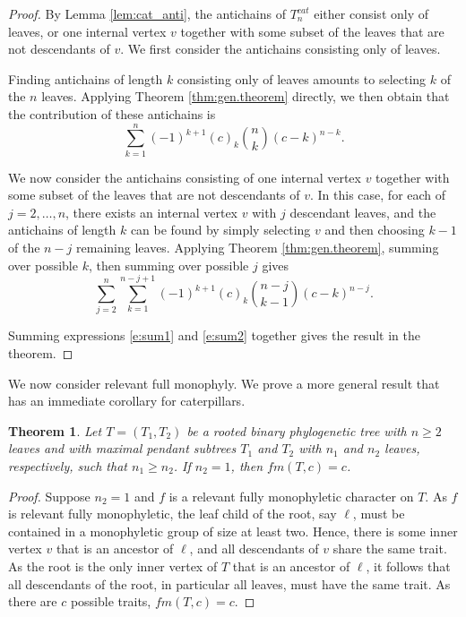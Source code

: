 \documentclass{amsart}
\newtheorem{theorem}{Theorem}
\theoremstyle{definition}
\begin{document}
\begin{proof}
By Lemma \ref{lem:cat_anti}, the antichains of $T_n^{cat}$ either consist only of leaves, or one internal vertex $v$ together with some subset of the leaves that are not descendants of $v$. We first consider the antichains consisting only of leaves. 

Finding antichains of length $k$ consisting only of leaves amounts to selecting $k$ of the $n$ leaves. Applying Theorem \ref{thm:gen.theorem} directly, we then obtain that the contribution of these antichains is 
\begin{equation}\label{e:sum1} 
\sum_{k=1}^{n}
(-1)^{k+1}
(c)_k
\binom{n}{k}
(c-k)^{n-k}.
\end{equation}

We now consider the antichains consisting of one internal vertex $v$ together with some subset of the leaves that are not descendants of $v$. In this case, for each of $j=2,\dots,n$, there exists an internal vertex $v$ with $j$ descendant leaves, and the antichains of length $k$ can be found by simply selecting $v$ and then choosing $k-1$ of the $n-j$ remaining leaves. Applying Theorem \ref{thm:gen.theorem}, summing over possible $k$, then summing over possible $j$ gives
\begin{equation}\label{e:sum2}
\sum_{j=2}^{n}
\sum_{k=1}^{n-j+1}
(-1)^{k+1}
(c)_k
\binom{n-j}{k-1}
(c-k)^{n-j}.
\end{equation}

Summing expressions \eqref{e:sum1} and \eqref{e:sum2} together gives the result in the theorem.
\end{proof}

We now consider relevant full monophyly. We prove a more general result that has an immediate corollary for caterpillars.

\begin{theorem}
    \label{thm:full.mono}
Let $T=(T_1,T_2)$ be a rooted binary phylogenetic tree with $n\geq 2$ leaves and with maximal pendant subtrees $T_1$ and $T_2$ with $n_1$ and $n_2$ leaves, respectively, such that $n_1 \geq n_2$. If $n_2=1$, then $fm(T,c)=c$. 
\end{theorem}

\begin{proof}
    Suppose $n_2 =1$ and $f$ is a relevant fully monophyletic character on $T$. As $f$ is relevant fully monophyletic, the leaf child of the root, say $\ell$, must be contained in a monophyletic group of size at least two. Hence, there is some inner vertex $v$ that is an ancestor of $\ell$, and all descendants of $v$ share the same trait. As the root is the only inner vertex of $T$ that is an ancestor of $\ell$, it follows that all descendants of the root, in particular all leaves, must have the same trait. As there are $c$ possible traits, $fm(T,c)=c$.
\end{proof}
\end{document}
